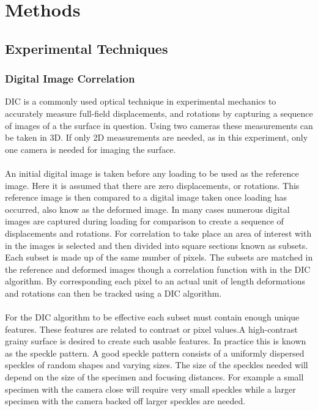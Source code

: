 \documentclass[12pt]{article}
\begin{document}
\section{Methods}

\subsection{Experimental Techniques} 

\subsubsection{Digital Image Correlation} %
DIC is a commonly used optical technique in experimental mechanics to accurately measure full-field displacements, and rotations by capturing a sequence of images of a the surface in question. Using two cameras these measurements can be taken in 3D. If only 2D measurements are needed, as in this experiment, only one camera is needed for imaging the surface.
\\
\\
An initial digital image is taken before any loading to be used as the reference image. Here it is assumed that there are zero displacements, or rotations.  This reference image is then compared to a digital image taken once loading has occurred, also know as the deformed image. In many cases numerous digital images are captured during loading for comparison to create a sequence of displacements and rotations.  For correlation to take place an area of interest with in the images is selected and then divided into square sections known as subsets. Each subset is made up of the same number of pixels.  The subsets are matched in the reference and deformed images though a correlation function with in the DIC algorithm. By corresponding each pixel to an actual unit of length deformations and rotations can then be tracked using a DIC algorithm.
\\
\\
For the DIC algorithm to be effective each subset must contain enough unique features.  These features are related to contrast or pixel values.A high-contrast grainy surface is desired to create such usable features. In practice this is known as the speckle pattern. A good speckle pattern consists of a uniformly dispersed speckles of  random shapes and varying sizes. The size of the speckles needed will depend on the size of the specimen and focusing distances. For example a small specimen with the camera close will require very small speckles while a larger specimen with the camera backed off larger speckles are needed. 
\end{document}
